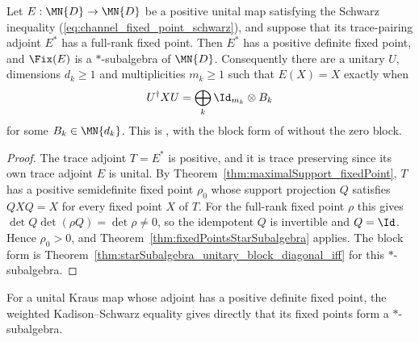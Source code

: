 \begin{theorem}
    \label{thm:fixedPointsStarSubalgebra_fullRank}
    \leanok
    Let $E:\MN{D}\to\MN{D}$ be a positive unital map satisfying the Schwarz
    inequality (\ref{eq:channel_fixed_point_schwarz}), and suppose that its
    trace-pairing adjoint $E^*$ has a full-rank fixed point. Then $E^*$ has a
    positive definite fixed point, and $\Fix(E)$ is a $*$-subalgebra of
    $\MN{D}$. Consequently there are a unitary $U$, dimensions $d_k\ge1$ and
    multiplicities $m_k\ge1$ such that $E(X)=X$ exactly when
    \begin{align*}
        U^\dagger XU=\bigoplus_k\Id_{m_k}\otimes B_k
    \end{align*}
    for some $B_k\in\MN{d_k}$. This is \cite[Theorem~6.12]{Wolf2012Quantum},
    with the block form of \cite[Equation~(1.39)]{Wolf2012Quantum} without the
    zero block.
\end{theorem}

\begin{proof}\leanok
    The trace adjoint $T=E^*$ is positive, and it is trace preserving since
    its own trace adjoint $E$ is unital. By
    Theorem~\ref{thm:maximalSupport_fixedPoint}, $T$ has a positive
    semidefinite fixed point $\rho_0$ whose support projection $Q$ satisfies
    $QXQ=X$ for every fixed point $X$ of $T$. For the full-rank fixed point
    $\rho$ this gives $\det Q\det(\rho Q)=\det\rho\ne0$, so the idempotent $Q$ is
    invertible and $Q=\Id$. Hence $\rho_0>0$, and
    Theorem~\ref{thm:fixedPointsStarSubalgebra} applies. The block form is
    Theorem~\ref{thm:starSubalgebra_unitary_block_diagonal_iff} for this
    $*$-subalgebra.
\end{proof}

\begin{remark}
    \leanok
    For a unital Kraus map whose adjoint has a positive definite fixed point,
    the weighted Kadison--Schwarz equality gives directly that its fixed
    points form a $*$-subalgebra.
\end{remark}

